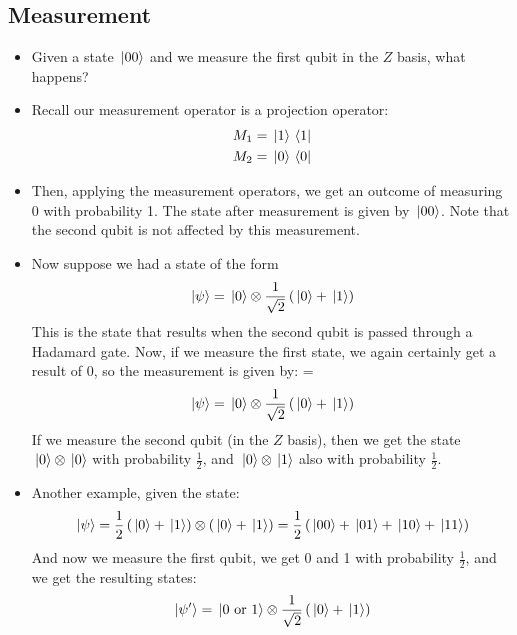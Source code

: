 \subsection{Measurement}
\begin{itemize}
	\item Given a state \( \ket*{00} \) and we measure the first qubit in the \( Z \) basis, what happens?
	\item Recall our measurement operator is a projection operator: 
		\begin{align*}
			M_1 &= \ket*{1}\bra*{1}\\
			M_2 &= \ket*{0}\bra*{0} 
		\end{align*}
	\item Then, applying the measurement operators, we get an outcome of measuring 0 with probability 1. The state
		after measurement is given by \( \ket*{00} \). Note that the second qubit is not affected by this measurement.  

	\item Now suppose we had a state of the form 
		\[
		\ket*{\psi} = \ket*{0}\otimes \frac{1}{\sqrt{2} }\left( \ket*{0} + \ket*{1} \right) 
		\] 
		This is the state that results when the second qubit is passed through a Hadamard gate. Now, if we measure 
		the first state, we again certainly get a result of 0, so the measurement is given by: =
		\[
		\ket*{\psi} = \ket*{0} \otimes \frac{1}{\sqrt{2} }\left( \ket*{0} + \ket*{1} \right) 
		\] 
		If we measure the second qubit (in the \( Z \) basis), then we get the state \( \ket*{0}\otimes \ket*{0} \) 
		with probability \( \frac{1}{2} \), and \( \ket*{0} \otimes \ket*{1} \) also with probability \( \frac{1}{2} \).
	\item Another example, given the state:
		\[
		\ket*{\psi} = \frac{1}{2 }\left( \ket*{0} + \ket*{1} \right) \otimes \left( \ket*{0} + \ket*{1} \right) 
		= \frac{1}{2}\left( \ket*{00} + \ket*{01} + \ket*{10} + \ket*{11} \right) 
		\] 
		And now we measure the first qubit, we get 0 and 1 with probability \( \frac{1}{2} \), and 
		we get the resulting states:
		\[
		\ket*{\psi'} = \ket*{0 \text{ or } 1} \otimes \frac{1}{\sqrt{2} }\left( \ket*{0} + \ket*{1} \right) 
		\] 
\end{itemize}
